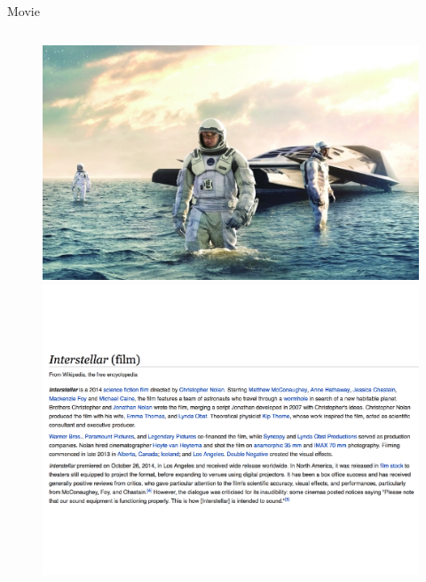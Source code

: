 \documentclass{beamer}
\begin{document}
\begin{frame}{Movie}
	\begin{figure}
	\begin{columns}[c]
			\centering\includegraphics[width=1.0\textwidth]{introduction/interstellar.jpg}\\
			\centering\includegraphics[width=1.0\textwidth]{introduction/interstellar_wiki.pdf} \\
		\pause

\end{columns}
\end{figure}
\end{frame}
\end{document}
